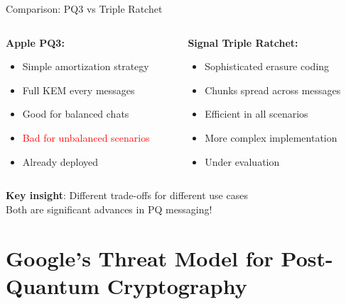 \documentclass[aspectratio=169, lualatex, handout]{beamer}
\begin{document}
\begin{frame}{Comparison: PQ3 vs Triple Ratchet}
	\begin{columns}[c]
		\begin{column}{0.5\textwidth}
			\textbf{Apple PQ3:}
			\begin{itemize}
				\item Simple amortization strategy
				\item Full KEM every  messages
				\item Good for balanced chats
				\item \textcolor{red}{Bad for unbalanced scenarios}
				\item Already deployed
			\end{itemize}
		\end{column}
		\begin{column}{0.5\textwidth}
			\textbf{Signal Triple Ratchet:}
			\begin{itemize}
				\item Sophisticated erasure coding
				\item Chunks spread across messages
				\item Efficient in all scenarios
				\item More complex implementation
				\item Under evaluation
			\end{itemize}
		\end{column}
	\end{columns}
	\vspace{5mm}
	\begin{center}
		\textbf{Key insight}: Different trade-offs for different use cases\\
		Both are significant advances in PQ messaging!
	\end{center}
\end{frame}

\section{Google's Threat Model for Post-Quantum Cryptography}
\end{document}
